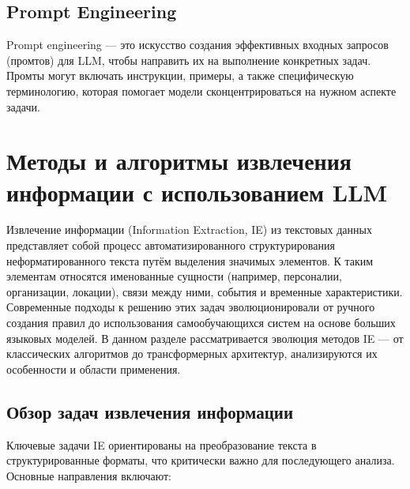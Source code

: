 \subsection{Prompt Engineering}

Prompt engineering — это искусство создания эффективных входных запросов (промтов) для LLM, чтобы направить их на выполнение конкретных задач. 
Промты могут включать инструкции, примеры, а также специфическую терминологию, которая помогает модели сконцентрироваться на нужном аспекте задачи. 

\section{Методы и алгоритмы извлечения информации с использованием LLM}

Извлечение информации (Information Extraction, IE) из текстовых данных представляет собой процесс автоматизированного структурирования неформатированного текста путём выделения значимых элементов. К таким элементам относятся именованные сущности (например, персоналии, организации, локации), связи между ними, события и временные характеристики. Современные подходы к решению этих задач эволюционировали от ручного создания правил до использования самообучающихся систем на основе больших языковых моделей. В данном разделе рассматривается эволюция методов IE — от классических алгоритмов до трансформерных архитектур, анализируются их особенности и области применения.

\subsection{Обзор задач извлечения информации}

Ключевые задачи IE ориентированы на преобразование текста в структурированные форматы, что критически важно для последующего анализа. Основные направления включают:

